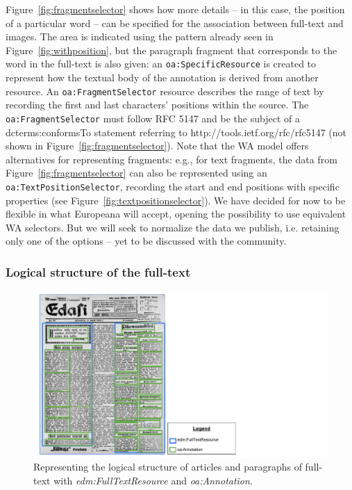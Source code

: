\documentclass[a4paper,UKenglish,cleveref, autoref]{oasics-v2019}
\begin{document}
Figure~\ref{fig:fragmentselector} shows how more details – in this case, the position of a particular word –  can be specified for the association between full-text and images. The area is indicated using the pattern already seen in Figure~\ref{fig:withposition}, but the paragraph fragment that corresponds to the word in the full-text is also given: an \verb+oa:SpecificResource+ is created to represent how the textual body of the annotation is derived from another resource. An \verb+oa:FragmentSelector+ resource describes the range of text by recording the first and last characters' positions within the source. The \verb+oa:FragmentSelector+ must follow RFC 5147 and be the subject of a dcterms:conformsTo statement referring to http://tools.ietf.org/rfc/rfc5147 (not shown in Figure~\ref{fig:fragmentselector}). Note that the WA model offers alternatives for representing fragments: e.g., for text fragments, the data from Figure~\ref{fig:fragmentselector} can also be represented using an \verb+oa:TextPositionSelector+, recording the start and end positions with specific properties (see Figure~\ref{fig:textpositionselector}). We have decided for now to be flexible in what Europeana will accept, opening the possibility to use equivalent WA selectors. But we will seek to normalize the data we publish, i.e. retaining only one of the options – yet to be discussed with the community.

\subsubsection{Logical structure of the full-text}

\begin{figure}
    \centering
    \includegraphics{Fig6}
    \caption{Representing the logical structure of articles and paragraphs of full-text with \emph{edm:FullTextResource} and \emph{oa:Annotation}.}\label{fig:logialstructure}
\end{figure}
\end{document}
